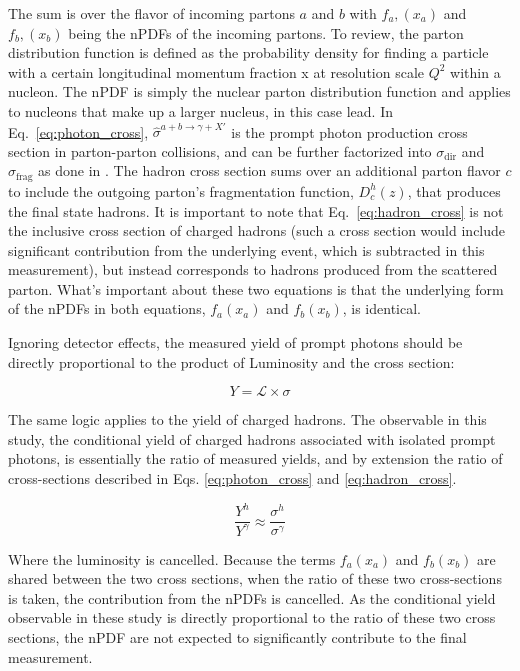 The sum is over the flavor of incoming partons $a$ and  $b$ with $f_{a},(x_a)$ and  $f_{b},(x_b)$ being the nPDFs of the incoming partons. To review, the parton distribution function is defined as the probability density for finding a particle with a certain longitudinal momentum fraction x at resolution scale $Q^2$ within a nucleon. The nPDF is simply the nuclear parton distribution function and applies to nucleons that make up a larger nucleus, in this case lead. In Eq.~\ref{eq:photon_cross}, $\hat{\sigma}^{a+b\rightarrow\gamma+X'}$ is the prompt photon production cross section in parton-parton collisions, and can be further factorized into $\sigma_\mathrm{dir}$ and $\sigma_\mathrm{frag}$ as done in \cite{williams2018}. The hadron cross section sums over an additional parton flavor $c$ to include the outgoing parton's fragmentation function, $D_c^h(z)$, that produces the final state hadrons. It is important to note that Eq.~\ref{eq:hadron_cross} is not the inclusive cross section of charged hadrons (such a cross section would include significant contribution from the underlying event, which is subtracted in this measurement), but instead corresponds to hadrons produced from the scattered parton. What's important about these two equations is that the underlying form of the nPDFs in both equations, $f_{a}(x_a)$ and $f_{b}(x_b)$, is identical. 

Ignoring detector effects, the measured yield of prompt photons should be directly proportional to the product of Luminosity and the cross section:

\begin{equation}
  Y = \mathcal{L}\times\sigma
\end{equation}

The same logic applies to the yield of charged hadrons. The observable in this study, the conditional yield of charged hadrons associated with isolated prompt photons, is essentially the ratio of measured yields, and by extension the ratio of cross-sections described in Eqs. \ref{eq:photon_cross} and \ref{eq:hadron_cross}. 

\begin{equation}
  \frac{Y^h}{Y^\gamma} \approx \frac{\sigma^h}{\sigma^\gamma}
  \label{eq:yield_ratios}
\end{equation}

Where the luminosity is cancelled. Because the terms $f_{a}(x_a)$ and $f_{b}(x_b)$ are shared between the two cross sections, when the ratio of these two cross-sections is taken, the contribution from the nPDFs is cancelled. As the conditional yield observable in these study is directly proportional to the ratio of these two cross sections, the nPDF are not expected to significantly contribute to the final measurement.

